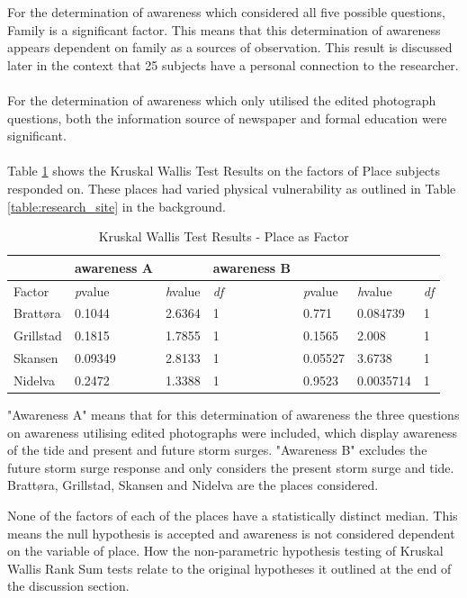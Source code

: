For the determination of awareness which considered all five possible questions, Family is a significant factor. This means that this determination of awareness appears dependent on family as a sources of observation. This result is discussed later in the context that 25 subjects have a personal connection to the researcher.
\paragraph{}
For the determination of awareness which only utilised the edited photograph questions, both the information source of newspaper and formal education were significant.
\paragraph{}
Table \ref{kwtest_place} shows the Kruskal Wallis Test Results on the factors of Place subjects responded on. These places had varied physical vulnerability as outlined in Table \ref{table:research_site} in the background.

\begin{table}[H]
    \centering
    \begin{tabular}{|l|l|l|l|l|l|l|}
    \hline
~ & \textbf{awareness A} & ~ & \textbf{awareness B} & ~ &  \\ \hline
        Factor &\textit{p}value &\textit{h}value & \textit{df} &\textit{p}value &\textit{h}value & \textit{df}\\ \hline
         Brattøra & 0.1044  & 2.6364 & 1 & 0.771 & 0.084739 &1\\ \hline
        Grillstad & 0.1815 & 1.7855 & 1 & 0.1565 & 2.008 & 1 \\ \hline
       Skansen & 0.09349 & 2.8133 & 1 & 0.05527 & 3.6738 & 1\\ \hline
         Nidelva & 0.2472 & 1.3388 & 1 & 0.9523 &  0.0035714 & 1\\ \hline
    \end{tabular}
    \caption{Kruskal Wallis Test Results - Place as Factor}{ "Awareness A" means that for this determination of awareness the three questions on awareness utilising edited photographs were included, which display awareness of the tide and present and future storm surges.  "Awareness B" excludes the future storm surge response and only considers the present storm surge and tide.  Brattøra, Grillstad, Skansen and Nidelva are the places considered.}
    \label{kwtest_place}
\end{table}
None of the factors of each of the places have a statistically distinct median. This means the null hypothesis is accepted and awareness is not considered dependent on the variable of place. 
  How the non-parametric hypothesis testing of Kruskal Wallis Rank Sum tests relate to the original hypotheses it outlined at the end of the discussion section.   
\paragraph{}

  









